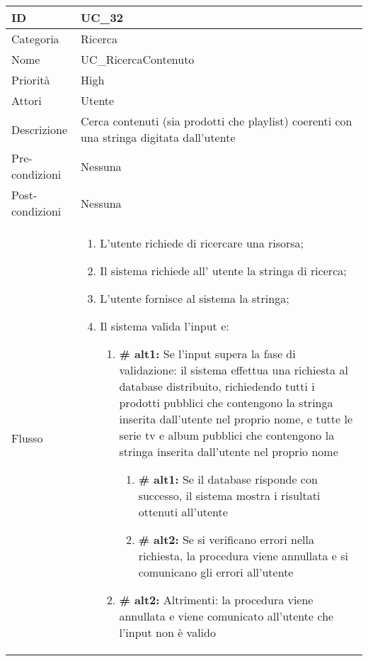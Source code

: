 \begin{center}
\begin{tabular}{ |p{2cm}|p{13cm}|  }
\hline
ID & UC\_32 \\\hline
Categoria & Ricerca \\\hline
Nome & UC\_RicercaContenuto\\\hline
Priorità & High \\\hline
Attori &  Utente \\\hline
Descrizione & Cerca contenuti (sia prodotti che playlist) coerenti con una stringa digitata dall'utente\\\hline
Pre-condizioni &  Nessuna\\\hline
Post-condizioni &  Nessuna\\\hline
Flusso &  	\begin{enumerate}
			\item L'utente richiede di ricercare una risorsa;
			\item Il sistema richiede all' utente la stringa di ricerca;
			\item L'utente fornisce al sistema la stringa;
			\item Il sistema valida l'input e:
			\begin{enumerate}[label*=\arabic*.]
			\item \textbf{\# alt1:} Se l'input supera la fase di validazione: il sistema effettua una richiesta al database distribuito, richiedendo tutti i prodotti pubblici che contengono la stringa inserita dall'utente nel proprio nome, e tutte le serie tv e album pubblici che contengono la stringa inserita dall'utente nel proprio nome
				\begin{enumerate}[label*=\arabic*.]
					\item \textbf{\# alt1:} Se il database risponde con successo, il sistema mostra i risultati ottenuti all'utente
					\item \textbf{\# alt2:} Se si verificano errori nella richiesta, la procedura viene annullata e si comunicano gli errori all'utente
				\end{enumerate}
			\item \textbf{\# alt2:} Altrimenti: la procedura viene annullata e viene comunicato all'utente che l'input non è valido
			\end{enumerate}
			
		\end{enumerate}\\\hline
\end{tabular}
\label{table_use_case:32}\newline


\end{center}
